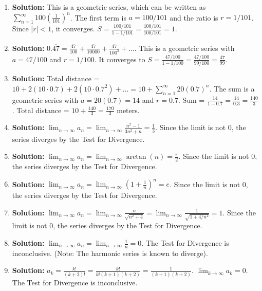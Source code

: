 \documentclass[12pt]{article}
\begin{document}
\begin{enumerate}
    \item \textbf{Solution:} This is a geometric series, which can be written as $\sum_{n=1}^\infty 100 \left(\frac{1}{101}\right)^n$. The first term is $a = 100/101$ and the ratio is $r=1/101$. Since $|r|<1$, it converges. $S = \frac{100/101}{1-1/101} = \frac{100/101}{100/101} = 1$.

    \item \textbf{Solution:} $0.\overline{47} = \frac{47}{100} + \frac{47}{10000} + \frac{47}{100^3} + \dots$. This is a geometric series with $a = 47/100$ and $r=1/100$. It converges to $S = \frac{47/100}{1-1/100} = \frac{47/100}{99/100} = \frac{47}{99}$.

    \item \textbf{Solution:} Total distance = $10 + 2(10 \cdot 0.7) + 2(10 \cdot 0.7^2) + \dots = 10 + \sum_{n=1}^\infty 20(0.7)^n$. The sum is a geometric series with $a=20(0.7)=14$ and $r=0.7$. Sum = $\frac{14}{1-0.7} = \frac{14}{0.3} = \frac{140}{3}$. Total distance = $10 + \frac{140}{3} = \frac{170}{3}$ meters.

    \item \textbf{Solution:} $\lim_{n\to\infty} a_n = \lim_{n\to\infty} \frac{n^2 - 1}{3n^2 + n} = \frac{1}{3}$. Since the limit is not 0, the series diverges by the Test for Divergence.

    \item \textbf{Solution:} $\lim_{n\to\infty} a_n = \lim_{n\to\infty} \arctan(n) = \frac{\pi}{2}$. Since the limit is not 0, the series diverges by the Test for Divergence.
    
    \item \textbf{Solution:} $\lim_{n\to\infty} a_n = \lim_{n\to\infty} \left(1 + \frac{1}{n}\right)^n = e$. Since the limit is not 0, the series diverges by the Test for Divergence.

    \item \textbf{Solution:} $\lim_{n\to\infty} a_n = \lim_{n\to\infty} \frac{n}{\sqrt{n^2+4}} = \lim_{n\to\infty} \frac{1}{\sqrt{1+4/n^2}} = 1$. Since the limit is not 0, the series diverges by the Test for Divergence.

    \item \textbf{Solution:} $\lim_{n\to\infty} a_n = \lim_{n\to\infty} \frac{1}{n} = 0$. The Test for Divergence is inconclusive. (Note: The harmonic series is known to diverge).

    \item \textbf{Solution:} $a_k = \frac{k!}{(k+2)!} = \frac{k!}{k!(k+1)(k+2)} = \frac{1}{(k+1)(k+2)}$. $\lim_{k\to\infty} a_k = 0$. The Test for Divergence is inconclusive.


\end{enumerate}
\end{document}
